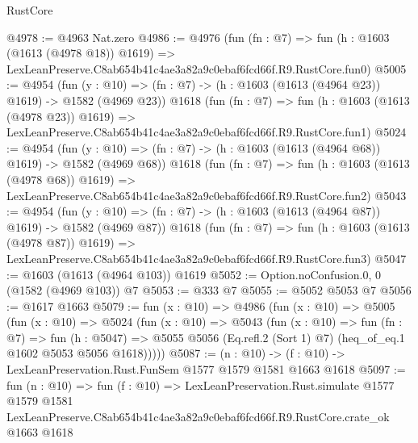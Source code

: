 \begin{lexlean}{RustCore}
\begin{coremodule}
@4978 := @4963 Nat.zero
@4986 := @4976
    (fun (fn : @7) =>
    fun (h : @1603 (@1613 (@4978 @18)) @1619) =>
    LexLeanPreserve.C8ab654b41c4ae3a82a9c0ebaf6fcd66f.R9.RustCore.fun0)
@5005 := @4954
    (fun (y : @10) => (fn : @7) -> (h : @1603 (@1613 (@4964 @23)) @1619) -> @1582 (@4969 @23))
    @1618
    (fun (fn : @7) =>
    fun (h : @1603 (@1613 (@4978 @23)) @1619) =>
    LexLeanPreserve.C8ab654b41c4ae3a82a9c0ebaf6fcd66f.R9.RustCore.fun1)
@5024 := @4954
    (fun (y : @10) => (fn : @7) -> (h : @1603 (@1613 (@4964 @68)) @1619) -> @1582 (@4969 @68))
    @1618
    (fun (fn : @7) =>
    fun (h : @1603 (@1613 (@4978 @68)) @1619) =>
    LexLeanPreserve.C8ab654b41c4ae3a82a9c0ebaf6fcd66f.R9.RustCore.fun2)
@5043 := @4954
    (fun (y : @10) => (fn : @7) -> (h : @1603 (@1613 (@4964 @87)) @1619) -> @1582 (@4969 @87))
    @1618
    (fun (fn : @7) =>
    fun (h : @1603 (@1613 (@4978 @87)) @1619) =>
    LexLeanPreserve.C8ab654b41c4ae3a82a9c0ebaf6fcd66f.R9.RustCore.fun3)
@5047 := @1603 (@1613 (@4964 @103)) @1619
@5052 := Option.noConfusion.{0, 0} (@1582 (@4969 @103)) @7
@5053 := @333 @7
@5055 := @5052 @5053 @7
@5056 := @1617 @1663
@5079 := fun (x : @10) =>
  @4986
    (fun (x : @10) =>
    @5005
      (fun (x : @10) =>
      @5024
        (fun (x : @10) =>
        @5043
          (fun (x : @10) =>
          fun (fn : @7) =>
          fun (h : @5047) =>
          @5055 @5056 (Eq.refl.{2} (Sort 1) @7) (heq_of_eq.{1} @1602 @5053 @5056 @1618)))))
@5087 := (n : @10) -> (f : @10) -> LexLeanPreservation.Rust.FunSem @1577 @1579 @1581 @1663 @1618
@5097 := fun (n : @10) =>
  fun (f : @10) =>
  LexLeanPreservation.Rust.simulate
    @1577
    @1579
    @1581
    LexLeanPreserve.C8ab654b41c4ae3a82a9c0ebaf6fcd66f.R9.RustCore.crate_ok
    @1663
    @1618
\end{coremodule}
\end{lexlean}
